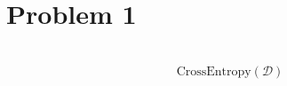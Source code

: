 \section{Problem 1}~\label{sec:prob1}
\begin{equation}
    \text{CrossEntropy}(\mathcal{D})
\end{equation}
